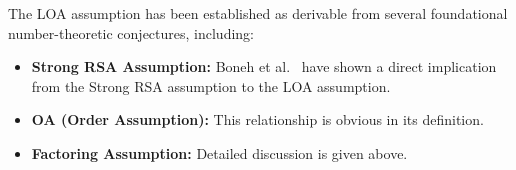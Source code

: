 \documentclass{iacrcc}
\begin{document}
\begin{remark}
The LOA assumption has been established as derivable from several foundational number-theoretic conjectures, including:
\begin{itemize}
\item \textbf{Strong RSA Assumption:} Boneh et al.~\cite{C:BonBunFis19} have shown a direct implication from the Strong RSA assumption to the LOA assumption.
\item \textbf{OA (Order Assumption):} This relationship is obvious in its definition.
\item \textbf{Factoring Assumption:} Detailed discussion is given above.
\end{itemize}
\end{remark}
\end{document}
